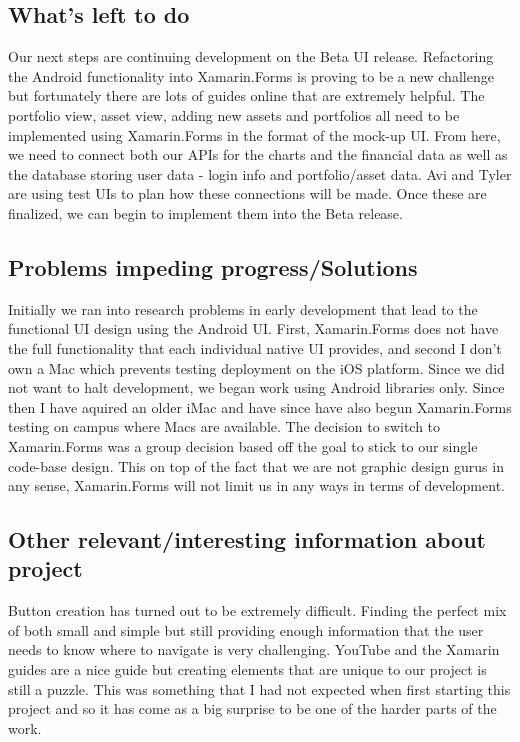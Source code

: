 \documentclass[letterpaper,10pt,titlepage,journal,compsoc,draftclsnofoot,onecolumn]{IEEEtran}
\begin{document}
\subsection{What's left to do}

Our next steps are continuing development on the Beta UI release. Refactoring the Android functionality into Xamarin.Forms is proving to be a new challenge but fortunately there are lots of guides online that are extremely helpful. The portfolio view, asset view, adding new assets and portfolios all need to be implemented using Xamarin.Forms in the format of the mock-up UI. From here, we need to connect both our APIs for the charts and the financial data as well as the database storing user data - login info and portfolio/asset data. Avi and Tyler are using test UIs to plan how these connections will be made. Once these are finalized, we can begin to implement them into the Beta release.

\subsection{Problems impeding progress/Solutions}

Initially we ran into research problems in early development that lead to the functional UI design using the Android UI. First, Xamarin.Forms does not have the full functionality that each individual native UI provides, and second I don't own a Mac which prevents testing deployment on the iOS platform. Since we did not want to halt development, we began work using Android libraries only. Since then I have aquired an older iMac and have since have also begun Xamarin.Forms testing on campus where Macs are available. The decision to switch to Xamarin.Forms was a group decision based off the goal to stick to our single code-base design. This on top of the fact that we are not graphic design gurus in any sense, Xamarin.Forms will not limit us in any ways in terms of development.

\subsection{Other relevant/interesting information about project}

Button creation has turned out to be extremely difficult. Finding the perfect mix of both small and simple but still providing enough information that the user needs to know where to navigate is very challenging. YouTube and the Xamarin guides are a nice guide but creating elements that are unique to our project is still a puzzle. This was something that I had not expected when first starting this project and so it has come as a big surprise to be one of the harder parts of the work.
\end{document}
